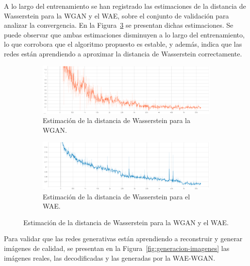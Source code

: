 A lo largo del entrenamiento se han registrado las estimaciones de la distancia de Wasserstein para la WGAN y el WAE, sobre el conjunto de validación para analizar la convergencia. En la Figura~\ref{fig:wass-dist} se presentan dichas estimaciones. Se puede observar que ambas estimaciones disminuyen a lo largo del entrenamiento, lo que corrobora que el algoritmo propuesto es estable, y además, indica que las redes están aprendiendo a aproximar la distancia de Wasserstein correctamente.

\begin{figure}[H]
    \begin{subfigure}[b]{0.8\textwidth}
        \centering
        \includegraphics[width=\textwidth]{img/wgan-wae/wass-dist-wgan.png}
        \caption{Estimación de la distancia de Wasserstein para la WGAN.}
        \label{fig:wass-dist-wgan}
    \end{subfigure}
    \begin{subfigure}[b]{0.8\textwidth}
        \centering
        \includegraphics[width=\textwidth]{img/wgan-wae/wass-dist-wae.png}
        \caption{Estimación de la distancia de Wasserstein para el WAE.}
        \label{fig:wass-dist-wae}
    \end{subfigure}
    \caption{Estimación de la distancia de Wasserstein para la WGAN y el WAE.}
    \label{fig:wass-dist}
\end{figure}

Para validar que las redes generativas están aprendiendo a reconstruir y generar imágenes de calidad,
se presentan en la Figura~\ref{fig:generacion-imagenes} las imágenes reales, las decodificadas y las generadas por la WAE-WGAN.

